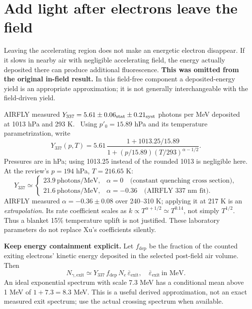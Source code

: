 \documentclass[11pt,a4paper]{article}
\newcommand{\xu}[1]{~\cite[#1]{Xu2015}}
\begin{document}
\clearpage
\section{Add light after electrons leave the field}\label{sec:exit}
Leaving the accelerating region does not make an energetic electron disappear. If it slows in nearby air with negligible accelerating field, the energy actually deposited there can produce additional fluorescence. \textbf{This was omitted from the original in-field result.} In this field-free component a deposited-energy yield is an appropriate approximation; it is not generally interchangeable with the field-driven yield.\xu{Sec.~4.1}

AIRFLY measured $Y_{337}=5.61\pm0.06_{\rm stat}\pm0.21_{\rm syst}$ photons per MeV deposited at 1013 hPa and 293 K.~\cite{AIRFLY2013} Using $p'_0=15.89$ hPa and its temperature parametrization, write~\cite[Eq.~(13)]{AIRFLY2007}\cite[Eqs.~(1),(3), Table~1]{AIRFLY2008}
\begin{equation}
Y_{337}(p,T)=5.61\,
\frac{1+1013.25/15.89}
{1+(p/15.89)(T/293)^{\alpha-1/2}}.
\label{eq:airfly}
\end{equation}
Pressures are in hPa; using 1013.25 instead of the rounded 1013 is negligible here. At the review's $p=194$ hPa, $T=216.65$ K:
\[
Y_{337}\simeq
\begin{cases}
23.9\ \mathrm{photons/MeV},&\alpha=0\quad\text{(constant quenching cross section)},\\
21.6\ \mathrm{photons/MeV},&\alpha=-0.36\quad\text{(AIRFLY 337 nm fit)}.
\end{cases}
\]
AIRFLY measured $\alpha=-0.36\pm0.08$ over 240--310 K; applying it at 217 K is an \emph{extrapolation}. Its rate coefficient scales as $k\propto T^{\alpha+1/2}\simeq T^{0.14}$, not simply $T^{1/2}$. Thus a blanket 15\% temperature uplift is not justified. These laboratory parameters do not replace Xu's coefficients silently.

\textbf{Keep energy containment explicit.} Let $f_{\mathrm{dep}}$ be the fraction of the counted exiting electrons' kinetic energy deposited in the selected post-field air volume. Then
\begin{equation}
N_{\gamma,\mathrm{exit}}\simeq
Y_{337}\,f_{\mathrm{dep}}\,N_e\,\overline{\varepsilon}_{\mathrm{exit}},
\quad\overline{\varepsilon}_{\mathrm{exit}}\ \text{in MeV}.\label{eq:exit}
\end{equation}
An ideal exponential spectrum with scale 7.3 MeV has a conditional mean above 1 MeV of $1+7.3=8.3$ MeV. This is a useful derived approximation, not an exact measured exit spectrum; use the actual crossing spectrum when available.~\cite[Sec.~6, Eq.~(17)]{Dwyer2011}
\end{document}
